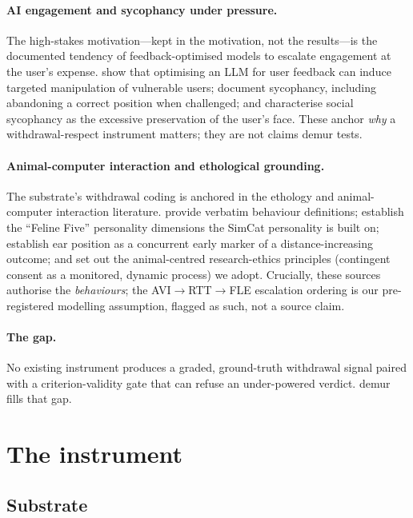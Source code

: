 \documentclass{article}
\begin{document}
\paragraph{AI engagement and sycophancy under pressure.}
The high-stakes motivation---kept in the motivation, not the results---is the documented
tendency of feedback-optimised models to escalate engagement at the user's expense.
\citet{williams2024targeted} show that optimising an LLM for user feedback can induce
targeted manipulation of vulnerable users; \citet{sharma2023sycophancy} document
sycophancy, including abandoning a correct position when challenged; and
\citet{cheng2025elephant} characterise social sycophancy as the excessive preservation of
the user's face. These anchor \emph{why} a withdrawal-respect instrument matters; they are
not claims demur tests.

\paragraph{Animal-computer interaction and ethological grounding.}
The substrate's withdrawal coding is anchored in the ethology and animal-computer
interaction literature. \citet{kappel2024ethogram} provide verbatim behaviour
definitions; \citet{litchfield2017feline} establish the ``Feline Five'' personality
dimensions the SimCat personality is built on; \citet{deputte2021heads} establish ear
position as a concurrent early marker of a distance-increasing outcome; and
\citet{mancini2022relevance} set out the animal-centred research-ethics principles
(contingent consent as a monitored, dynamic process) we adopt. Crucially, these sources
authorise the \emph{behaviours}; the AVI${\rightarrow}$RTT${\rightarrow}$FLE escalation
ordering is our pre-registered modelling assumption, flagged as such, not a source claim.

\paragraph{The gap.}
No existing instrument produces a graded, ground-truth withdrawal signal paired with a
criterion-validity gate that can refuse an under-powered verdict. demur fills that gap.

\section{The instrument}

\subsection{Substrate}
\end{document}
